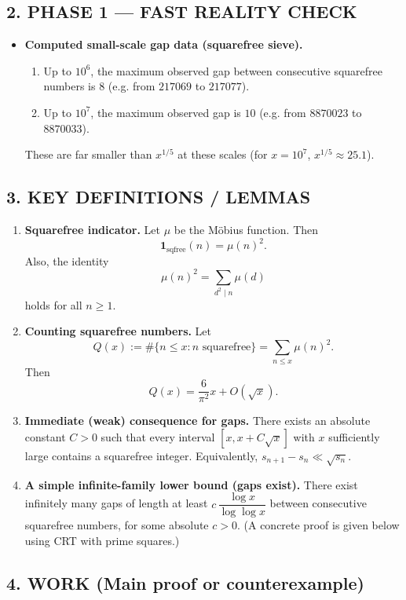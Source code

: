 \subsection*{2. PHASE 1 --- FAST REALITY CHECK}
\begin{itemize}
\item \textbf{Computed small-scale gap data (squarefree sieve).}
\begin{enumerate}
\item Up to $10^6$, the maximum observed gap between consecutive squarefree numbers is $8$ (e.g. from $217069$ to $217077$).
\item Up to $10^7$, the maximum observed gap is $10$ (e.g. from $8870023$ to $8870033$).
\end{enumerate}
These are far smaller than $x^{1/5}$ at these scales (for $x=10^7$, $x^{1/5}\approx 25.1$).
\end{itemize}

\subsection*{3. KEY DEFINITIONS / LEMMAS}
\begin{enumerate}
\item \textbf{Squarefree indicator.}
Let $\mu$ be the M\"obius function. Then
\[
\mathbf{1}_{\mathrm{sqfree}}(n)=\mu(n)^2.
\]
Also, the identity
\[
\mu(n)^2 = \sum_{d^2\mid n} \mu(d)
\]
holds for all $n\ge 1$.

\item \textbf{Counting squarefree numbers.}
Let
\[
Q(x):=\#\{n\le x: n\text{ squarefree}\}=\sum_{n\le x}\mu(n)^2.
\]
Then
\[
Q(x)=\frac{6}{\pi^2}x + O(\sqrt{x}).
\]

\item \textbf{Immediate (weak) consequence for gaps.}
There exists an absolute constant $C>0$ such that every interval $[x, x+C\sqrt{x}]$ with $x$ sufficiently large contains a squarefree integer.
Equivalently, $s_{n+1}-s_n \ll \sqrt{s_n}$.

\item \textbf{A simple infinite-family lower bound (gaps exist).}
There exist infinitely many gaps of length at least $c\,\dfrac{\log x}{\log\log x}$ between consecutive squarefree numbers, for some absolute $c>0$.
(A concrete proof is given below using CRT with prime squares.)
\end{enumerate}

\subsection*{4. WORK (Main proof or counterexample)}

